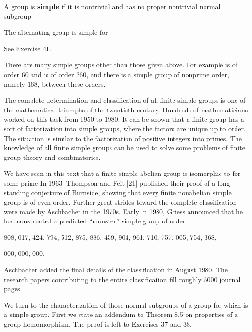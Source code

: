 \documentclass[11pt,oneside]{article}
\begin{document}
\begin{BookBody}

 A group is\textbf{ simple} if it is nontrivial and has no proper nontrivial normal subgroup\BookEnd{\blacksquare}

 The alternating group  is simple for 

 See Exercise 41. \BookEnd{\blacklozenge}

There are many simple groups other than those given above. For example is of order 60 and  is of order 360, and there is a simple group of nonprime order, namely 168, between these orders.

The complete determination and classification of all finite simple groups is one of the mathematical triumphs of the twentieth century. Hundreds of mathematicians worked on this task from 1950 to 1980. It can be shown that a finite group has a sort of factorization into simple groups, where the factors are unique up to order. The situation is similar to the factorization of positive integers into primes. The knowledge of all finite simple groups can be used to solve some problems of finite group theory and combinatorics.

We have seen in this text that a finite simple abelian group is isomorphic to  for some prime  In 1963, Thompson and Feit [21] published their proof of a long-standing conjecture of Burnside, showing that every finite nonabelian simple group is of even order. Further great strides toward the complete classification were made by Aschbacher in the 1970s. Early in 1980, Griess announced that he had constructed a predicted “monster” simple group of order

808, 017, 424, 794, 512, 875, 886, 459, 904, 961, 710, 757, 005, 754, 368,

000, 000, 000.

\noindent Aschbacher added the final details of the classification in August 1980. The research papers contributing to the entire classification fill roughly 5000 journal pages.

We turn to the characterization of those normal subgroups  of a group  for which  is a simple group. First we state an addendum to Theorem 8.5 on properties of a group homomorphism. The proof is left to Exercises 37 and 38.


\end{BookBody}
\end{document}
